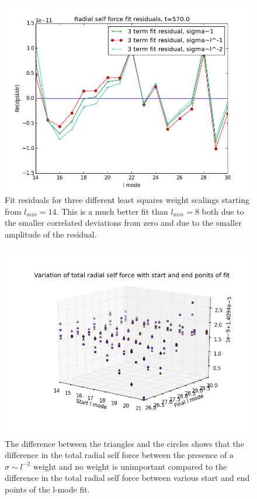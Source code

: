 \begin{figure}
\includegraphics{fitresidulas3terms570l14}
\caption{Fit residuals for three different least squares weight scalings starting from $l_{min}=14$. This is a much better fit than $l_{min}=8$ both due to the smaller correlated deviations from zero and due to the smaller amplitude of the residual.}
\label{14goodfit}
\end{figure}

\begin{figure}
  \includegraphics{3Dscatterwithwithoutsigmalminlmax}
  \caption{The difference between the triangles and the circles shows that the difference in the total radial self force between the presence of a $\sigma\sim l^{-2}$ weight and no weight is unimportant compared to the difference in the total radial self force between various start and end points of the l-mode fit.}
\end{figure}

